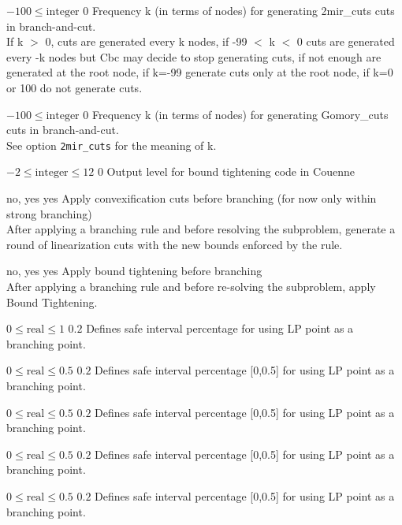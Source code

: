 %
{$-100\leq\textrm{integer}$}%
{$0$}%
{Frequency k (in terms of nodes) for generating 2mir\_cuts cuts in branch-and-cut.\\
If k $>$ 0, cuts are generated every k nodes, if -99 $<$ k $<$ 0 cuts are generated every -k nodes but Cbc may decide to stop generating cuts, if not enough are generated at the root node, if k=-99 generate cuts only at the root node, if k=0 or 100 do not generate cuts.}%
{}

%
{$-100\leq\textrm{integer}$}%
{$0$}%
{Frequency k (in terms of nodes) for generating Gomory\_cuts cuts in branch-and-cut.\\
See option \texttt{2mir\_cuts} for the meaning of k.}%
{}

%
{$-2\leq\textrm{integer}\leq12$}%
{$0$}%
{Output level for bound tightening code in Couenne}%
{}

%
{\ttfamily no, yes}%
{yes}%
{Apply convexification cuts before branching (for now only within strong branching)\\
After applying a branching rule and before resolving the subproblem, generate a round of linearization cuts with the new bounds enforced by the rule.}%
{}

%
{\ttfamily no, yes}%
{yes}%
{Apply bound tightening before branching\\
After applying a branching rule and before re-solving the subproblem, apply Bound Tightening.}%
{}

%
{$0\leq\textrm{real}\leq1$}%
{$0.2$}%
{Defines safe interval percentage for using LP point as a branching point.}%
{}

%
{$0\leq\textrm{real}\leq0.5$}%
{$0.2$}%
{Defines safe interval percentage [0,0.5] for using LP point as a branching point.}%
{}

%
{$0\leq\textrm{real}\leq0.5$}%
{$0.2$}%
{Defines safe interval percentage [0,0.5] for using LP point as a branching point.}%
{}

%
{$0\leq\textrm{real}\leq0.5$}%
{$0.2$}%
{Defines safe interval percentage [0,0.5] for using LP point as a branching point.}%
{}

%
{$0\leq\textrm{real}\leq0.5$}%
{$0.2$}%
{Defines safe interval percentage [0,0.5] for using LP point as a branching point.}%
{}

